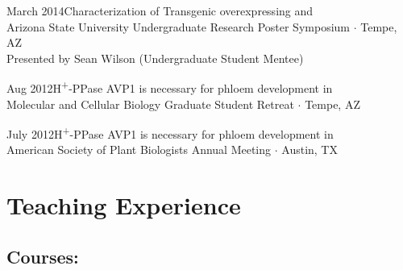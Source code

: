 \documentclass[]{cv-style}          %
\begin{document}
\begin{entrylist}
\entry
{March 2014}{\normalfont Characterization of Transgenic  overexpressing  and }{\\Arizona State University Undergraduate Research Poster Symposium $\cdotp$ Tempe, AZ\\
Presented by Sean Wilson (Undergraduate Student Mentee)}
{\vspace{-0.3cm}}
\end{entrylist}

\begin{entrylist}
\entry
{Aug 2012}{\normalfont H\textsuperscript{+}-PPase AVP1 is necessary for phloem development in }{\\Molecular and Cellular Biology Graduate Student Retreat $\cdotp$ Tempe, AZ}
{\vspace{-0.3cm}}
\end{entrylist}

\begin{entrylist}
\entry
{July 2012}{\normalfont H\textsuperscript{+}-PPase AVP1 is necessary for phloem development in }{\\American Society of Plant Biologists Annual Meeting $\cdotp$ Austin, TX}
{\vspace{-0.3cm}}
\end{entrylist}
\pagebreak


\section{Teaching Experience}
\subsection{\textbf{Courses:}}
\end{document}

